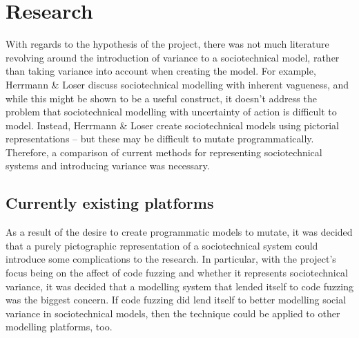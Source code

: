 \chapter{Research}
\label{research_head}
With regards to the hypothesis of the project, there was not much literature revolving around the introduction of variance to a sociotechnical model, rather than taking variance into account when creating the model. For example, Herrmann \& Loser\cite{Herrmann1999} discuss sociotechnical modelling with inherent vagueness, and while this might be shown to be a useful construct, it doesn't address the problem that sociotechnical modelling with uncertainty of action is difficult to model. Instead, Herrmann & Loser create sociotechnical models using pictorial representations -- but these may be difficult to mutate programmatically. Therefore, a comparison of current methods for representing sociotechnical systems and introducing variance was necessary. \par

\section{Currently existing platforms}
As a result of the desire to create programmatic models to mutate, it was decided that a purely pictographic representation of a sociotechnical system could introduce some complications to the research. In particular, with the project's focus being on the affect of code fuzzing and whether it represents sociotechnical variance, it was decided that a modelling system that lended itself to code fuzzing was the biggest concern. If code fuzzing did lend itself to better modelling social variance in sociotechnical models, then the technique could be applied to other modelling platforms, too. \par

